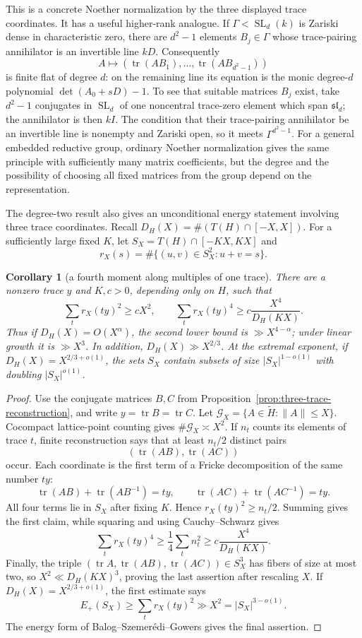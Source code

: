 \documentclass[11pt,reqno]{amsart}
\newtheorem{corollary}[theorem]{Corollary}
\theoremstyle{definition}
\theoremstyle{remark}
\newcommand{\Tr}{\operatorname{tr}}
\newcommand{\SL}{\operatorname{SL}}
\begin{document}
This is a concrete Noether normalization by the three displayed trace
coordinates.
It has a useful higher-rank analogue.  If \(\Gamma<\SL_d(k)\) is Zariski
dense in characteristic zero, there are \(d^2-1\) elements
\(B_j\in\Gamma\) whose trace-pairing annihilator is an invertible line
\(kD\).  Consequently
\[
 A\longmapsto(\Tr(AB_1),\ldots,\Tr(AB_{d^2-1}))
\]
is finite flat of degree \(d\): on the remaining line its equation is the
monic degree-\(d\) polynomial \(\det(A_0+sD)-1\).  To see that suitable
matrices \(B_j\) exist, take \(d^2-1\) conjugates in \(\SL_d\) of one noncentral
trace-zero element which span \(\mathfrak{sl}_d\); the annihilator is then
\(kI\).  The condition that their trace-pairing annihilator be an invertible
line is nonempty and Zariski open, so it meets
\(\Gamma^{d^2-1}\).  For a general embedded reductive group, ordinary
Noether normalization gives the same principle with sufficiently many
matrix coefficients, but the degree and the possibility of choosing all
fixed matrices from the group depend on the representation.

The degree-two result also gives an unconditional energy statement involving
three trace coordinates.  Recall
\(D_H(X)=\#(T(H)\cap[-X,X])\).  For a sufficiently large fixed \(K\), let
\(S_X=T(H)\cap[-KX,KX]\) and
\[
 r_X(s)=\#\{(u,v)\in S_X^2:u+v=s\}.
\]

\begin{corollary}[a fourth moment along multiples of one trace]
\label{cor:trace-coordinate-fourth-moment}
There are a nonzero trace \(y\) and \(K,c>0\), depending only on \(H\), such
that
\[
 \sum_t r_X(ty)^2\ge cX^2,
 \qquad
 \sum_t r_X(ty)^4\ge c\frac{X^4}{D_H(KX)}.
\]
Thus if \(D_H(X)=O(X^\alpha)\), the second lower bound is
\(\gg X^{4-\alpha}\); under linear growth it is \(\gg X^3\).  In addition,
\(D_H(X)\gg X^{2/3}\).  At the extremal exponent, if
\(D_H(X)=X^{2/3+o(1)}\), the sets \(S_X\) contain subsets of size
\(|S_X|^{1-o(1)}\) with doubling \(|S_X|^{o(1)}\).
\end{corollary}

\begin{proof}
Use the conjugate matrices \(B,C\) from
Proposition~\ref{prop:three-trace-reconstruction}, and write
\(y=\Tr B=\Tr C\).  Let
\(\mathcal G_X=\{A\in\widetilde H:\lVert A\rVert\le X\}\).  Cocompact
lattice-point counting gives \(\#\mathcal G_X\asymp X^2\).  If \(n_t\)
counts its elements of trace \(t\), finite reconstruction says that at least
\(n_t/2\) distinct pairs
\[
 (\Tr(AB),\Tr(AC))
\]
occur.  Each coordinate is the first term of a Fricke decomposition of the
same number \(ty\):
\[
 \Tr(AB)+\Tr(AB^{-1})=ty,
 \qquad
 \Tr(AC)+\Tr(AC^{-1})=ty.
\]
All four terms lie in \(S_X\) after fixing \(K\).  Hence
\(r_X(ty)^2\ge n_t/2\).  Summing gives the first claim, while squaring and
using Cauchy--Schwarz gives
\[
 \sum_t r_X(ty)^4\ge\frac14\sum_t n_t^2
 \ge c\frac{X^4}{D_H(KX)}.
\]
Finally, the triple
\((\Tr A,\Tr(AB),\Tr(AC))\in S_X^3\) has fibers of size at most two, so
\(X^2\ll D_H(KX)^3\), proving the last assertion after rescaling \(X\).
If \(D_H(X)=X^{2/3+o(1)}\), the first estimate says
\[
 E_+(S_X)\ge\sum_t r_X(ty)^2\gg X^2=|S_X|^{3-o(1)}.
\]
The energy form of Balog--Szemer\'edi--Gowers gives the final assertion.
\end{proof}
\end{document}
